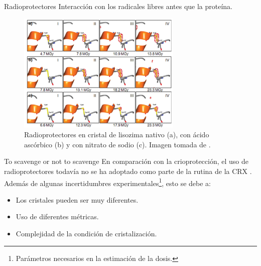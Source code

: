 \documentclass{beamer}
\begin{document}
\begin{frame}{Radioprotectores}
Interacción con los radicales libres antes que la proteína.
 \begin{figure}[h]
  \centering
  \includegraphics[width=0.7\textwidth]{delamora2011.png}
  \caption{Radioprotectores en cristal de lisozima nativo (a), con ácido ascórbico (b) y con nitrato de sodio (c). Imagen tomada de \cite{DeLaMora2011}.}
  \label{fig:delamora2011}
 \end{figure}
\end{frame}
\begin{frame}{To scavenge or not to scavenge}
En comparación con la crioprotección, el uso de radioprotectores todavía no se ha adoptado como parte de la rutina de la CRX \cite{Nowak2009,Allan2013}. Además de algunas incertidumbres experimentales\footnote{Parámetros necesarios en la estimación de la dosis.}, esto se debe a:
 \begin{itemize}
  \item Los cristales pueden ser muy diferentes.
  \item Uso de diferentes métricas.
  \item Complejidad de la condición de cristalización.
 \end{itemize}
\end{frame}
\end{document}
